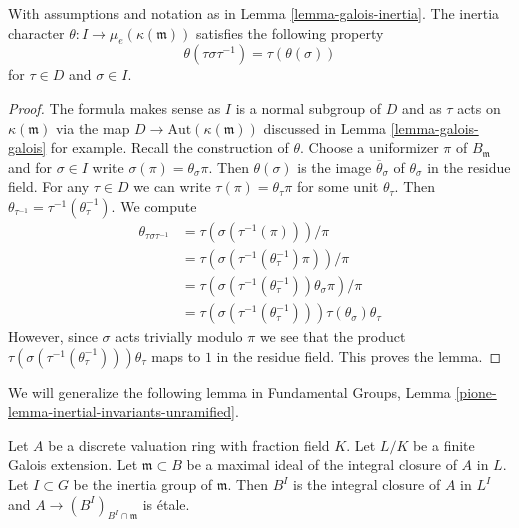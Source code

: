 \begin{lemma}
\label{lemma-inertia-character}
With assumptions and notation as in Lemma \ref{lemma-galois-inertia}.
The inertia character $\theta : I \to \mu_e(\kappa(\mathfrak m))$
satisfies the following property
$$
\theta(\tau \sigma \tau^{-1}) = \tau(\theta(\sigma))
$$
for $\tau \in D$ and $\sigma \in I$.
\end{lemma}

\begin{proof}
The formula makes sense as $I$ is a normal subgroup of $D$
and as $\tau$ acts on $\kappa(\mathfrak m)$ via the map
$D \to \text{Aut}(\kappa(\mathfrak m))$ discussed in
Lemma \ref{lemma-galois-galois} for example.
Recall the construction of $\theta$. Choose
a uniformizer $\pi$ of $B_\mathfrak m$ and for
$\sigma \in I$ write $\sigma(\pi) = \theta_\sigma \pi$.
Then $\theta(\sigma)$ is the image $\overline{\theta}_\sigma$
of $\theta_\sigma$ in the residue field. For any $\tau \in D$
we can write $\tau(\pi) = \theta_\tau \pi$ for some unit $\theta_\tau$.
Then $\theta_{\tau^{-1}} = \tau^{-1}(\theta_\tau^{-1})$.
We compute
\begin{align*}
\theta_{\tau \sigma \tau^{-1}}
& =
\tau(\sigma(\tau^{-1}(\pi)))/\pi \\
& =
\tau(\sigma(\tau^{-1}(\theta_\tau^{-1}) \pi))/\pi \\
& =
\tau(\sigma(\tau^{-1}(\theta_\tau^{-1})) \theta_\sigma \pi)/\pi \\
& =
\tau(\sigma(\tau^{-1}(\theta_\tau^{-1}))) \tau(\theta_\sigma) \theta_\tau
\end{align*}
However, since $\sigma$ acts trivially modulo $\pi$ we see that
the product $\tau(\sigma(\tau^{-1}(\theta_\tau^{-1}))) \theta_\tau$
maps to $1$ in the residue field. This proves the lemma.
\end{proof}

\noindent
We will generalize the following lemma in
Fundamental Groups, Lemma \ref{pione-lemma-inertial-invariants-unramified}.

\begin{lemma}
\label{lemma-inertial-invariants-unramified}
Let $A$ be a discrete valuation ring with fraction field $K$.
Let $L/K$ be a finite Galois extension. Let $\mathfrak m \subset B$
be a maximal ideal of the integral closure of $A$ in $L$.
Let $I \subset G$ be the inertia group of $\mathfrak m$.
Then $B^I$ is the integral closure of $A$ in $L^I$ and
$A \to (B^I)_{B^I \cap \mathfrak m}$ is \'etale.
\end{lemma}

